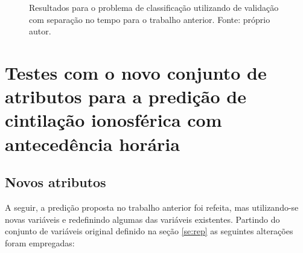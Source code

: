 \begin{figure}[h]
\center
{}
\caption{Resultados para o problema de classificação utilizando de validação com separação no tempo para o trabalho anterior. Fonte: próprio autor.}
\label{fig:classomii}
\end{figure}


\section{Testes com o novo conjunto de atributos para a predição de cintilação ionosférica com antecedência horária}\label{sec:new}

\subsection{Novos atributos}\label{sec:v1}

A seguir, a predição proposta no trabalho anterior foi refeita, mas utilizando-se novas variáveis e redefinindo algumas das variáveis existentes. Partindo do conjunto de variáveis original definido na seção \ref{se:rep} as seguintes alterações foram empregadas:

